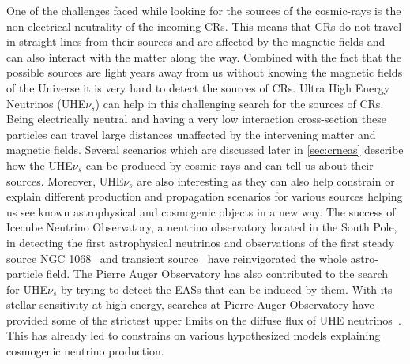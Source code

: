 One of the challenges faced while looking for the sources of the cosmic-rays is the non-electrical neutrality of the incoming CRs. This means that CRs do not travel in straight lines from their sources and are affected by the magnetic fields and can also interact with the matter along the way\cite{}. Combined with the fact that the possible sources are light years away from us without knowing the magnetic fields of the Universe it is very hard to detect the sources of CRs. Ultra High Energy Neutrinos (UHE$\nu_s$) can help in this challenging search for the sources of CRs\cite{}. Being electrically neutral and having a very low interaction cross-section these particles can travel large distances unaffected by the intervening matter and magnetic fields. Several scenarios which are discussed later in \ref{sec:crneas} describe how the UHE$\nu_s$ can be produced by cosmic-rays and can tell us about their sources. Moreover, UHE$\nu_s$ are also interesting as they can also help constrain or explain different production and propagation scenarios for various sources helping us see known astrophysical and cosmogenic objects in a new way. The success of Icecube Neutrino Observatory, a neutrino observatory located in the South Pole,  in detecting the first astrophysical neutrinos and observations of the first steady source NGC 1068~\cite{} and transient source~\cite{} have reinvigorated the whole astro-particle field. The Pierre Auger Observatory has also contributed to the search for UHE$\nu_s$ by trying to detect the EASs that can be induced by them. With its stellar sensitivity at high energy, searches at Pierre Auger Observatory have provided some of the strictest upper limits on the diffuse flux of UHE neutrinos~\cite{}. This has already led to constrains on various hypothesized models explaining cosmogenic neutrino production.

